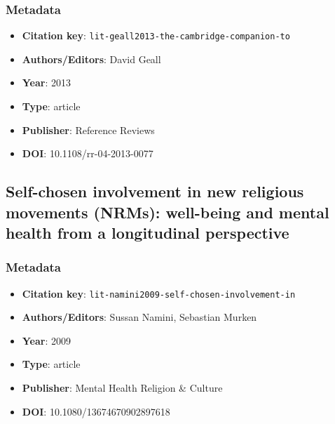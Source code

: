 \subsubsection*{Metadata}
\begin{itemize}
  \item \textbf{Citation key}: \texttt{lit-geall2013-the-cambridge-companion-to}
  \item \textbf{Authors/Editors}: David Geall
  \item \textbf{Year}: 2013
  \item \textbf{Type}: article
  \item \textbf{Publisher}: Reference Reviews
  \item \textbf{DOI}: 10.1108/rr-04-2013-0077
\end{itemize}

\subsection{Self-chosen involvement in new religious movements (NRMs): well-being and mental health from a longitudinal perspective}\label{lit:lit-namini2009-self-chosen-involvement-in}
\subsubsection*{Metadata}
\begin{itemize}
  \item \textbf{Citation key}: \texttt{lit-namini2009-self-chosen-involvement-in}
  \item \textbf{Authors/Editors}: Sussan Namini, Sebastian Murken
  \item \textbf{Year}: 2009
  \item \textbf{Type}: article
  \item \textbf{Publisher}: Mental Health Religion \& Culture
  \item \textbf{DOI}: 10.1080/13674670902897618
\end{itemize}
